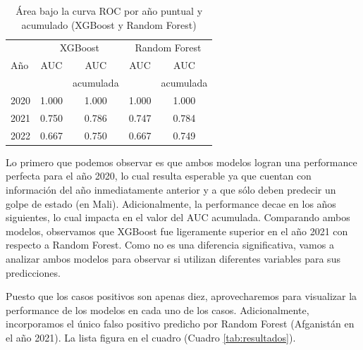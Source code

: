 \documentclass{article}
\begin{document}
\begin{table}[H]
 \centering
  \begin{tabular}{lcccc}
   \toprule
   & \multicolumn{2}{c}{XGBoost} & \multicolumn{2}{c}{Random Forest} \\
   Año & AUC   & AUC   & AUC   & AUC \\
      &     & acumulada&     & acumulada \\
   \midrule
   2020 & 1.000 & 1.000 & 1.000 & 1.000 \\
   2021 & 0.750 & 0.786 & 0.747 & 0.784 \\
   2022 & 0.667 & 0.750 & 0.667 & 0.749 \\
   \bottomrule
  \end{tabular}
 \caption{Área bajo la curva ROC por año puntual y acumulado (XGBoost y 
 Random Forest) \label{tab:performance}}
\end{table}

Lo primero que podemos observar es que ambos modelos logran una performance perfecta 
para el año 2020, lo cual resulta esperable ya que cuentan con información del año 
inmediatamente anterior y a que sólo deben predecir un golpe de estado (en Mali).
Adicionalmente, la performance decae en los años siguientes, 
lo cual impacta en el valor del AUC acumulada. Comparando ambos modelos, observamos
que XGBoost fue ligeramente superior en el año 2021 con respecto a Random Forest.
Como no es una diferencia significativa, vamos a analizar ambos modelos para observar
si utilizan diferentes variables para sus predicciones.

Puesto que los casos positivos son apenas diez, aprovecharemos para visualizar la performance
de los modelos en cada uno de los casos. Adicionalmente, incorporamos el único falso positivo
predicho por Random Forest (Afganistán en el año 2021). La lista figura en el cuadro 
(Cuadro \ref{tab:resultados}).
\end{document}
